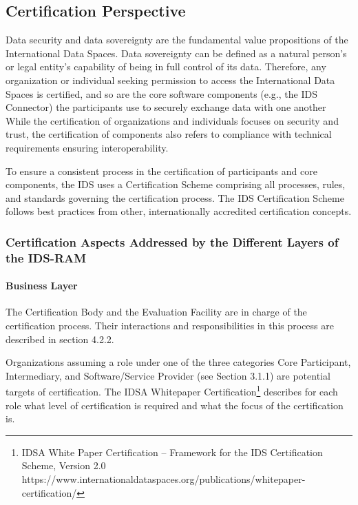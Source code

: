 
\subsection{Certification Perspective}

Data security and data sovereignty are the fundamental value propositions of the International Data Spaces. Data sovereignty can be defined as a natural person’s or legal entity’s capability of being in full control of its data. Therefore, any organization or individual seeking permission to access the International Data Spaces is certified, and so are the core software components (e.g., the IDS Connector) the participants use to securely exchange data with one another While the certification of organizations and individuals focuses on security and trust, the certification of components also refers to compliance with technical requirements ensuring interoperability.


To ensure a consistent process in the certification of participants and core components, the IDS uses a Certification Scheme comprising all processes, rules, and standards governing the certification process. The IDS Certification Scheme follows best practices from other, internationally accredited certification concepts. 



\subsubsection{Certification Aspects Addressed by the Different Layers of the IDS-RAM}
\paragraph{Business Layer\\}

The Certification Body and the Evaluation Facility are in charge of the certification process. Their interactions and responsibilities in this process are described in section 4.2.2.


Organizations assuming a role under one of the three categories Core Participant, Intermediary, and Software/Service Provider (see Section 3.1.1) are potential targets of certification. The IDSA Whitepaper Certification\footnote{ IDSA White Paper Certification – Framework for the IDS Certification Scheme, Version 2.0 https://www.internationaldataspaces.org/publications/whitepaper-certification/ } describes for each role what level of certification is required and what the focus of the certification is.



